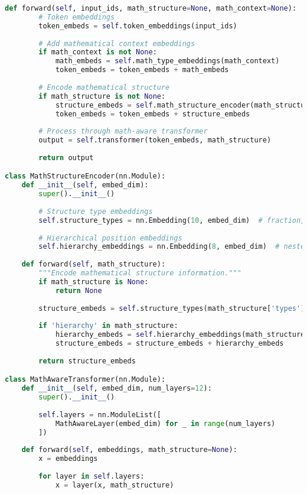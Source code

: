 \begin{lstlisting}[language=Python, caption=Mathematical formula tokenization system]
    def forward(self, input_ids, math_structure=None, math_context=None):
        # Token embeddings
        token_embeds = self.token_embeddings(input_ids)
        
        # Add mathematical context embeddings
        if math_context is not None:
            math_embeds = self.math_type_embeddings(math_context)
            token_embeds = token_embeds + math_embeds
        
        # Encode mathematical structure
        if math_structure is not None:
            structure_embeds = self.math_structure_encoder(math_structure)
            token_embeds = token_embeds + structure_embeds
        
        # Process through math-aware transformer
        output = self.transformer(token_embeds, math_structure)
        
        return output

class MathStructureEncoder(nn.Module):
    def __init__(self, embed_dim):
        super().__init__()
        
        # Structure type embeddings
        self.structure_types = nn.Embedding(10, embed_dim)  # fraction, integral, etc.
        
        # Hierarchical position embeddings
        self.hierarchy_embeddings = nn.Embedding(8, embed_dim)  # nested levels
        
    def forward(self, math_structure):
        """Encode mathematical structure information."""
        if math_structure is None:
            return None
        
        structure_embeds = self.structure_types(math_structure['types'])
        
        if 'hierarchy' in math_structure:
            hierarchy_embeds = self.hierarchy_embeddings(math_structure['hierarchy'])
            structure_embeds = structure_embeds + hierarchy_embeds
        
        return structure_embeds

class MathAwareTransformer(nn.Module):
    def __init__(self, embed_dim, num_layers=12):
        super().__init__()
        
        self.layers = nn.ModuleList([
            MathAwareLayer(embed_dim) for _ in range(num_layers)
        ])
        
    def forward(self, embeddings, math_structure=None):
        x = embeddings
        
        for layer in self.layers:
            x = layer(x, math_structure)
        

\end{lstlisting}
